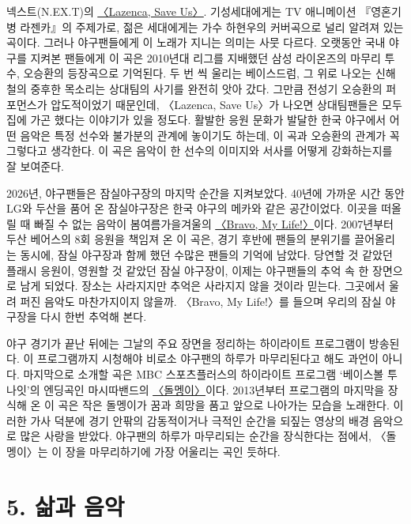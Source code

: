\documentclass{article}
\let\plainhref\href
\renewcommand{\href}[2]{\plainhref{#1}{\underline{#2}}}
\begin{document}
 \indent 넥스트(N.EX.T)의 \href{https://youtu.be/8GKE823m-hw?si=nczjFQG77hKrVEq_}{〈Lazenca, Save Us〉}. 기성세대에게는 TV 애니메이션 『영혼기병 라젠카』의 주제가로, 젊은 세대에게는 가수 하현우의 커버곡으로 널리 알려져 있는 곡이다. 그러나 야구팬들에게 이 노래가 지니는 의미는 사뭇 다르다. 오랫동안 국내 야구를 지켜본 팬들에게 이 곡은 2010년대 리그를 지배했던 삼성 라이온즈의 마무리 투수, 오승환의 등장곡으로 기억된다. 두 번 씩 울리는 베이스드럼, 그 위로 나오는 신해철의 중후한 목소리는 상대팀의 사기를 완전히 앗아 갔다. 그만큼 전성기 오승환의 퍼포먼스가 압도적이었기 때문인데, 〈Lazenca, Save Us〉가 나오면 상대팀팬들은 모두 집에 가곤 했다는 이야기가 있을 정도다. 활발한 응원 문화가 발달한 한국 야구에서 어떤 음악은 특정 선수와 불가분의 관계에 놓이기도 하는데, 이 곡과 오승환의 관계가 꼭 그렇다고 생각한다. 이 곡은 음악이 한 선수의 이미지와 서사를 어떻게 강화하는지를 잘 보여준다.
\medskip

 \indent 2026년, 야구팬들은 잠실야구장의 마지막 순간을 지켜보았다. 40년에 가까운 시간 동안 LG와 두산을 품어 온 잠실야구장은 한국 야구의 메카와 같은 공간이었다. 이곳을 떠올릴 때 빠질 수 없는 음악이 봄여름가을겨울의 \href{https://youtu.be/MhlvBxEW4SQ?si=ok2qn8BEyxltJbPZ&t=18}{〈Bravo, My Life!〉}이다. 2007년부터 두산 베어스의 8회 응원을 책임져 온 이 곡은, 경기 후반에 팬들의 분위기를 끌어올리는 동시에, 잠실 야구장과 함께 했던 수많은 팬들의 기억에 남았다. 당연할 것 같았던 플래시 응원이, 영원할 것 같았던 잠실 야구장이, 이제는 야구팬들의 추억 속 한 장면으로 남게 되었다. 장소는 사라지지만 추억은 사라지지 않을 것이라 믿는다. 그곳에서 울려 퍼진 음악도 마찬가지이지 않을까. 〈Bravo, My Life!〉를 들으며 우리의 잠실 야구장을 다시 한번 추억해 본다. 
\medskip

 \indent 야구 경기가 끝난 뒤에는 그날의 주요 장면을 정리하는 하이라이트 프로그램이 방송된다. 이 프로그램까지 시청해야 비로소 야구팬의 하루가 마무리된다고 해도 과언이 아니다. 마지막으로 소개할 곡은 MBC 스포츠플러스의 하이라이트 프로그램 `베이스볼 투나잇'의 엔딩곡인 마시따밴드의 \href{https://youtu.be/u5Aj7oDDMeQ?si=0zRCUFLrT8UJhXqM}{〈돌멩이〉}이다. 2013년부터 프로그램의 마지막을 장식해 온 이 곡은 작은 돌멩이가 꿈과 희망을 품고 앞으로 나아가는 모습을 노래한다. 이러한 가사 덕분에 경기 안팎의 감동적이거나 극적인 순간을 되짚는 영상의 배경 음악으로 많은 사랑을 받았다. 야구팬의 하루가 마무리되는 순간을 장식한다는 점에서, 〈돌멩이〉는 이 장을 마무리하기에 가장 어울리는 곡인 듯하다.   

\section{5. 삶과 음악}
\label{sec.5}
\end{document}
